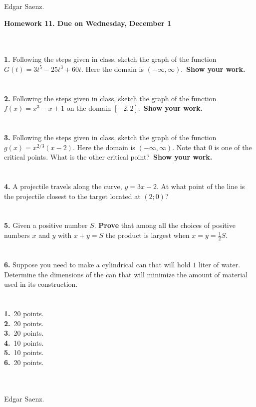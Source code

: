 \documentclass[12pt]{article}
\begin{document}
\begin{flushright}
Edgar Saenz.
\end{flushright}
\newpage
\begin{center}
\textbf{Homework 11. Due on Wednesday, December 1}
\end{center}\
\\
\\
\textbf{1.} Following the steps given in class, sketch the graph of
the function $G(t)=3t^{5}-25t^{3}+60t$. Here the domain is
$(-\infty, \infty)$.\ \textbf{Show your work.}\\\\\\
\textbf{2.} Following the steps given in class, sketch the graph of
the function $f(x)=x^{3}-x+1$ on the domain $[-2,2]$.\ \textbf{Show your work.}\\\\\\
\textbf{3.} Following the steps given in class, sketch the graph of
the function $g(x)=x^{2/3}(x-2)$. Here the domain is
$(-\infty,\infty)$. Note that $0$ is one of the critical points.
What is the other critical point?\ \textbf{Show your work.}\\\\\\
\textbf{4.} A projectile travels along the curve, $y =3x-2$. At what
point of the line is the projectile closest to the
target located at $(2;0)$?\\\\\\
\textbf{5.} Given a positive number $S$. \textbf{Prove} that among
all the choices of positive numbers $x$ and $y$ with $x+y=S$ the
product is largest when $x=y=\frac{1}{2}S$.\\\\\\
\textbf{6.} Suppose you need to make a cylindrical can that will
hold $1$ liter of water.  Determine the dimensions of the can that
will minimize the amount of material used in its construction.
\\\\\\
\textbf{1.}\ 20 points.\\
\textbf{2.}\ 20 points.\\
\textbf{3.}\ 20 points.\\
\textbf{4.}\ 10 points.\\
\textbf{5.}\ 10 points.\\
\textbf{6.}\ 20 points.\\
\\
\\
\begin{flushright}
Edgar Saenz.
\end{flushright}
\end{document}
